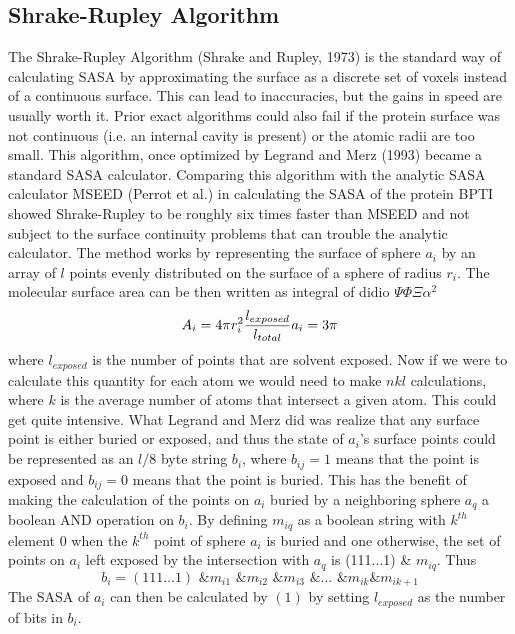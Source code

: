 \documentclass{article}
\begin{document}
\subsection{Shrake-Rupley Algorithm}
The Shrake-Rupley Algorithm (Shrake and Rupley, 1973) is the standard way of calculating SASA by approximating the surface as a discrete set of voxels instead of a continuous surface. This can lead to inaccuracies, but the gains in speed are usually worth it. Prior exact algorithms could also fail if the protein surface was not continuous (i.e. an internal cavity is present) or the atomic radii are too small. This algorithm, once optimized by Legrand and Merz (1993) became a standard SASA calculator. Comparing this algorithm with the analytic SASA calculator MSEED (Perrot et al.) in calculating the SASA of the protein BPTI showed Shrake-Rupley to be roughly six times faster than MSEED and not subject to the surface continuity problems that can trouble the analytic calculator. The method works by representing the surface of sphere $a_i$ by an array of $l$ points evenly distributed on the surface of a sphere of radius $r_i$. The molecular surface area can be then written as integral of didio $\Psi\Phi\Xi\alpha^2$
\begin{equation}
A_i=4\pi r_i^2\frac{l_{exposed}}{l_{total}} \\
a_i = 3\pi
\end{equation}
where $l_{exposed}$ is the number of points that are solvent exposed. Now if we were to calculate this quantity for each atom we would need to make $nkl$ calculations, where $k$ is the average number of atoms that intersect a given atom. This could get quite intensive. What Legrand and Merz did was realize that any surface point is either buried or exposed, and thus the state of $a_i$'s surface points could be represented as an $l/8$ byte string $b_i$, where $b_{ij}=1$ means that the point is exposed and $b_{ij}=0$ means that the point is buried. This has the benefit of making the calculation of the points on $a_i$ buried by a neighboring sphere $a_q$ a boolean AND operation on $b_i$. By defining $m_{iq}$ as a boolean string with $k^{th}$ element 0 when the $k^{th}$ point of sphere $a_i$ is buried and one otherwise, the set of points on $a_i$ left exposed by the intersection with $a_q$ is (111...1) \& $m_{iq}$. Thus 
\begin{equation*}
b_i=(111...1) \text{ \& } m_{i1} \text{ \& } m_{i2} \text{ \& } m_{i3} \text{ \& }...\text{ \& } m_{ik} \& m_{ik+1}
\end{equation*}
The SASA of $a_i$ can then be calculated by $(1)$ by setting $l_{exposed}$ as the number of bits in $b_i$. \par
\end{document}
